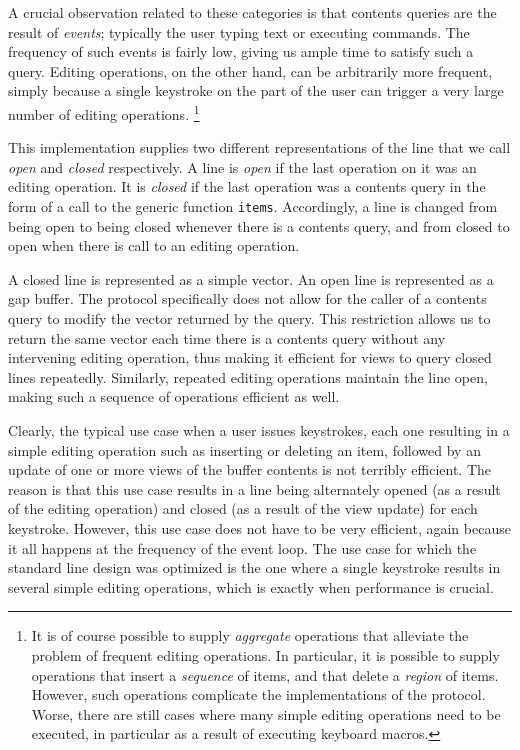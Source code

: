 A crucial observation related to these categories is that contents
queries are the result of \emph{events}; typically the user typing
text or executing commands.  The frequency of such events is fairly
low, giving us ample time to satisfy such a query.  Editing
operations, on the other hand, can be arbitrarily more frequent,
simply because a single keystroke on the part of the user can trigger
a very large number of editing operations.%
\footnote{It is of course possible to supply \emph{aggregate}
  operations that alleviate the problem of frequent editing
  operations.  In particular, it is possible to supply operations that
  insert a \emph{sequence} of items, and that delete a \emph{region}
  of items.  However, such operations complicate the implementations
  of the protocol.  Worse, there are still cases where many simple
  editing operations need to be executed, in particular as a result of
  executing keyboard macros.}

This implementation supplies two different representations of the line
that we call \emph{open} and \emph{closed} respectively.  A line is
\emph{open} if the last operation on it was an editing operation.  It
is \emph{closed} if the last operation was a contents query in the
form of a call to the generic function \texttt{items}.  Accordingly, a
line is changed from being open to being closed whenever there is a
contents query, and from closed to open when there is call to an
editing operation.

A closed line is represented as a \commonlisp{} simple vector.  An
open line is represented as a gap buffer. 
The protocol specifically does not allow for the caller of a contents
query to modify the vector returned by the query.  This restriction
allows us to return the same vector each time there is a contents
query without any intervening editing operation, thus making it
efficient for views to query closed lines repeatedly.  Similarly,
repeated editing operations maintain the line open, making such a
sequence of operations efficient as well.

Clearly, the typical use case when a user issues keystrokes, each one
resulting in a simple editing operation such as inserting or deleting
an item, followed by an update of one or more views of the buffer
contents is not terribly efficient.  The reason is that this use case
results in a line being alternately opened (as a result of the editing
operation) and closed (as a result of the view update) for each
keystroke.  However, this use case does not have to be very efficient,
again because it all happens at the frequency of the event loop.  The
use case for which the standard line design was optimized is the one
where a single keystroke results in several simple editing operations,
which is exactly when performance is crucial.

